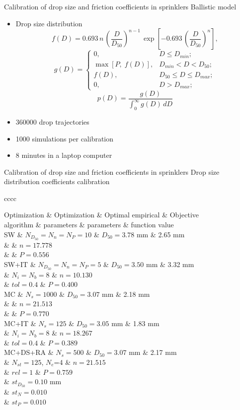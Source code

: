 \documentclass[10pt]{beamer}
\newcommand{\C}[1]{\left[#1\right]}
\newcommand{\PA}[1]{\left(#1\right)}
\newcommand{\TABLE}[3]
{
	\begin{table}[ht!]
		\centering
		#1
		\tabulinesep=0.9mm
		\begin{tabu}{#2}
			#3
		\end{tabu}
	\end{table}
}
\begin{document}
\begin{frame}{Calibration of drop size and friction coefficients in sprinklers}
{Ballistic model}
\begin{itemize}
	\item Drop size distribution
\[
	f(D)=0.693\,n\,\PA{\frac{D}{D_{50}}}^{n-1}
	\,\exp\C{-0.693\,\PA{\frac{D}{D_{50}}}^n},
\]
\[
	g(D)=\left\{\begin{array}{lc}0,&D\leq D_{min};\\
	\max[P,\;f(D)],&D_{min}<D<D_{50};\\f(D),&D_{50}\leq D\leq D_{max};\\
	0,&D>D_{max};\end{array}\right.
\]
\[
	p(D)=\frac{g(D)}{\int_0^\infty g(D)\,dD}
\]
	\item 360000 drop trajectories
	\item 1000 simulations per calibration
	\item 8 minutes in a laptop computer
\end{itemize}
\end{frame}

\begin{frame}{Calibration of drop size and friction coefficients in sprinklers}
{Drop size distribution coefficients calibration}
\TABLE{\tiny}{cccc}
{
	Optimization & Optimization & Optimal empirical & Objective
	\\ algorithm & parameters & parameters & function value
	\\ \hline
	SW & $N_{D_{50}}=N_n=N_P=10$ & $D_{50}=3.78$ mm & 2.65 mm
	\\ & & $n=17.778$
	\\ & & $P=0.556$
	\\ \hline
	SW+IT & $N_{D_{50}}=N_n=N_P=5$ & $D_{50}=3.50$ mm & 3.32 mm
	\\ & $N_i=N_b=8$ & $n=10.130$
	\\ & $tol=0.4$ & $P=0.400$
	\\ \hline
	MC & $N_s=1000$ & $D_{50}=3.07$ mm & 2.18 mm
	\\ & & $n=21.513$
	\\ & & $P=0.770$
	\\ \hline
	MC+IT & $N_s=125$ & $D_{50}=3.05$ mm & 1.83 mm
	\\ & $N_i=N_b=8$ & $n=18.267$
	\\ & $tol=0.4$ & $P=0.389$
	\\ \hline
	MC+DS+RA & $N_s=500$ & $D_{50}=3.07$ mm & 2.17 mm
	\\ & $N_{st}=125$, $N_e$=4 & $n=21.515$
	\\ & $rel=1$ & $P=0.759$
	\\ & $st_{D_{50}}=0.10$ mm
	\\ & $st_N=0.010$
	\\ & $st_P=0.010$
	\\ \hline
}
\end{frame}
\end{document}
